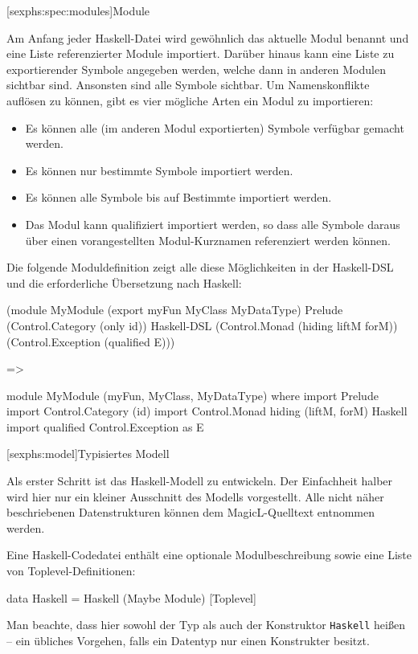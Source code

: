 \documentclass[12pt, a4paper, bibgerm]{scrbook}
\newenvironment{DIFnomarkup}{}{}
\newcommand\icode[1]{\lstinline?#1?}
\newcommand\lsection{}
\newcommand\lsubsection{}
\begin{document}
\lsubsection[sexphs:spec:modules]{Module}

Am Anfang jeder Haskell-Datei wird gewöhnlich das aktuelle Modul
benannt und eine Liste referenzierter Module importiert. Darüber
hinaus kann eine Liste zu exportierender Symbole angegeben werden,
welche dann in anderen Modulen sichtbar sind. Ansonsten sind alle
Symbole sichtbar. Um Namenskonflikte auf\/lösen zu können, gibt es vier
mögliche Arten ein Modul zu importieren:
\begin{itemize}
\item Es können alle (im anderen Modul exportierten) Symbole verfügbar gemacht
  werden.
\item Es können nur bestimmte Symbole importiert werden.
\item Es können alle Symbole bis auf Bestimmte importiert werden.
\item Das Modul kann qualifiziert importiert werden, so dass alle
  Symbole daraus über einen vorangestellten Modul-Kurznamen
  referenziert werden können.
\end{itemize}
Die folgende Moduldefinition zeigt alle diese Möglichkeiten in der
Haskell-DSL und die erforderliche Übersetzung nach Haskell:
\begin{DIFnomarkup}\begin{code}
(module MyModule
  (export myFun MyClass MyDataType)
  Prelude
  (Control.Category (only id))                       Haskell-DSL
  (Control.Monad (hiding liftM forM))
  (Control.Exception (qualified E)))

=>

module MyModule (myFun, MyClass, MyDataType) where
import Prelude
import Control.Category (id)
import Control.Monad hiding (liftM, forM)            Haskell
import qualified Control.Exception as E
\end{code}\end{DIFnomarkup}


\lsection[sexphs:model]{Typisiertes Modell}

Als erster Schritt ist das Haskell-Modell zu entwickeln. Der Einfachheit
halber wird hier nur ein kleiner Ausschnitt des Modells
vorgestellt. Alle nicht näher beschriebenen Datenstrukturen können dem
MagicL-Quelltext entnommen werden.

Eine Haskell-Codedatei enthält eine optionale Modulbeschreibung sowie
eine Liste von Toplevel-Definitionen:
\begin{DIFnomarkup}\begin{code}
data Haskell = Haskell (Maybe Module) [Toplevel]
\end{code}\end{DIFnomarkup}
Man beachte, dass hier sowohl der Typ als auch der Konstruktor
\icode{Haskell} heißen -- ein übliches Vorgehen, falls ein Datentyp nur
einen Konstrukter besitzt.
\end{document}
